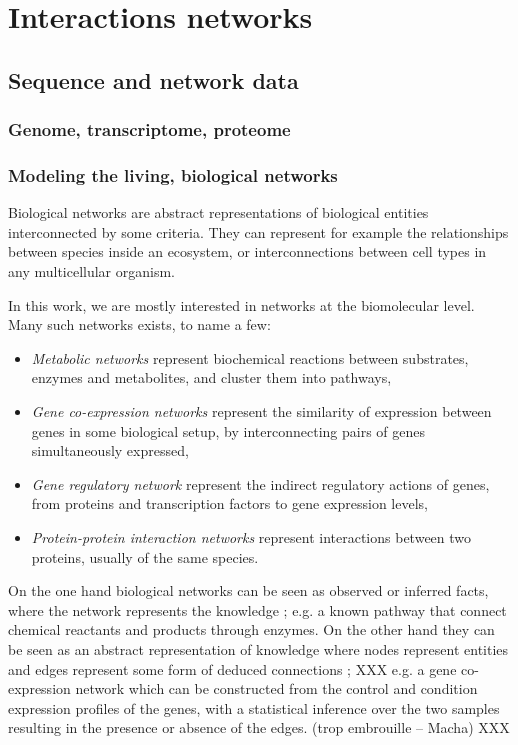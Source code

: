 \chapter{Interactions networks}
\label{chap:prelim}

	\section{Sequence and network data}

		\subsection{Genome, transcriptome, proteome}

		\subsection{Modeling the living, biological networks}
			Biological networks are abstract representations of biological entities interconnected by some criteria.
			They can represent for example the relationships between species inside an ecosystem, or interconnections between cell types in any multicellular organism.

			In this work, we are mostly interested in networks at the biomolecular level.
			Many such networks exists, to name a few:
			\begin{itemize}
				\item \emph{Metabolic networks} represent biochemical reactions between substrates, enzymes and metabolites, and cluster them into pathways,
				\item \emph{Gene co-expression networks} represent the similarity of expression between genes in some biological setup, by interconnecting pairs of genes simultaneously expressed,
				\item \emph{Gene regulatory network} represent the indirect regulatory actions of genes, from proteins and transcription factors to gene expression levels,
				\item \emph{Protein-protein interaction networks} represent interactions between two proteins, usually of the same species.
			\end{itemize}

			On the one hand biological networks can be seen as observed or inferred facts, where the network represents the knowledge ; e.g. a known pathway that connect chemical reactants and products through enzymes.
			On the other hand they can be seen as an abstract representation of knowledge where nodes represent entities and edges represent some form of deduced connections ; XXX e.g. a gene co-expression network which can be constructed from the control and condition expression profiles of the genes, with a statistical inference over the two samples resulting in the presence or absence of the edges. (trop embrouille -- Macha) XXX

